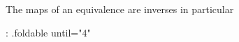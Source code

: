 The maps of an equivalence are inverses in particular

{: .foldable until="4" }
\begin{code}%
%
\>[2]\<%
\\
\>[2][@{}l@{\AgdaIndent{0}}]%
\>[4]\AgdaSymbol{:}\AgdaSpace{}%
\AgdaSymbol{(}\AgdaSpace{}%
\AgdaSymbol{:}\AgdaSpace{}%
\AgdaSpace{}%
\AgdaSpace{}%
\AgdaSymbol{)}\AgdaSpace{}%
\AgdaSpace{}%
\AgdaSymbol{\{}\AgdaSpace{}%
\AgdaSymbol{:}\AgdaSpace{}%
\AgdaSymbol{\}}\<%
\\
%
\>[4]\AgdaComment{-----------------------}\<%
\\
%
\>[4]\AgdaSpace{}%
\AgdaSymbol{(}\AgdaSpace{}%
\AgdaSymbol{)}\AgdaSpace{}%
\AgdaSymbol{((}\AgdaSpace{}%
\AgdaSymbol{)}\AgdaSpace{}%
\AgdaSymbol{)}\AgdaSpace{}%
\AgdaOperator{\AgdaDatatype{==}}\AgdaSpace{}%
\<%
\\
%
\\[\AgdaEmptyExtraSkip]%
%
\>[2]\AgdaSpace{}%
\AgdaSymbol{(}\AgdaSpace{}%
\AgdaOperator{\AgdaInductiveConstructor{,}}\AgdaSpace{}%
\AgdaSymbol{)}\AgdaSpace{}%
\AgdaSymbol{\{}\AgdaSymbol{\}}\AgdaSpace{}%
\AgdaSymbol{=}\AgdaSpace{}%
\AgdaSpace{}%
\AgdaSymbol{(}\AgdaSpace{}%
\AgdaSymbol{(}\AgdaSpace{}%
\AgdaSymbol{))}\<%
\end{code}

\begin{code}%
%
\>[2]\AgdaSpace{}%
\AgdaSymbol{=}\AgdaSpace{}%
\<%
\end{code}

